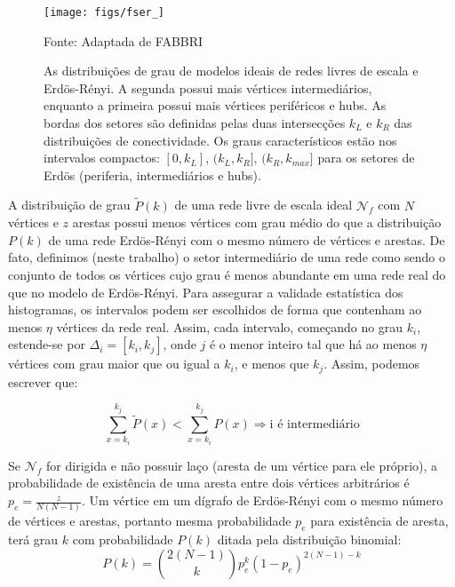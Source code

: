 \documentclass[a4paper,openright,12pt]{report} %
\newcommand{\source}[1]{\caption*{Fonte: {#1}} }
\begin{document}
\begin{figure}[!h]
    \centering
    \caption{ \footnotesize As distribuições de grau de modelos ideais de redes livres de escala e Erdös-Rényi.
        A segunda possui mais vértices intermediários, enquanto a primeira possui mais vértices
        periféricos e hubs. As bordas dos setores são definidas pelas duas intersecções $k_L$
        e $k_R$ das distribuições de conectividade.
        Os graus característicos estão nos intervalos compactos:
                $[0,k_L]$, $(k_L,k_R]$, $(k_R,k_{max}]$
    para os setores de Erdös (periferia, intermediários e hubs).}   
    \texttt{[image: figs/fser\_]}
        \source{Adaptada de FABBRI~\cite{timeS}}
        \label{fig:setores}
\end{figure}
\vspace{-.3cm}


A distribuição de grau
$\widetilde{P}(k)$
de uma rede livre de escala ideal
$\mathcal{N}_f$ com $N$ 
vértices e $z$ arestas possui menos
vértices com grau médio do que a distribuição $P(k)$
de uma rede Erdös-Rényi com o mesmo número de vértices e arestas.
De fato, definimos (neste trabalho) o setor intermediário de uma
rede como sendo o conjunto de todos os vértices cujo grau é
menos abundante em uma rede real do que no modelo de Erdös-Rényi.
Para assegurar a validade estatística dos histogramas, os intervalos podem
ser escolhidos de forma que contenham ao menos $\eta$ vértices da rede real.
Assim, cada intervalo, começando no grau $k_i$, estende-se por
$\Delta_i=[k_{i},k_{j}]$,
onde $j$ é o menor inteiro tal que há ao menos $\eta$ vértices com grau maior que ou igual a $k_i$,
e menos que $k_j$.
Assim, podemos escrever que:

\begin{equation}\label{criterio2}
    \sum_{x=k_i}^{k_j} \widetilde{P}(x) < \sum_{x=k_i}^{k_j} P(x) \Rightarrow \text{i é intermediário}
\end{equation}

Se $\mathcal{N}_f$ for dirigida e não possuir laço (aresta de um vértice para ele próprio),
a probabilidade
de existência de uma aresta entre dois vértices arbitrários é
$p_e=\frac{z}{N(N-1)}$.
Um vértice em um dígrafo de Erdös-Rényi com o mesmo número de vértices e arestas,
portanto mesma probabilidade
$p_e$
para existência de aresta, terá grau $k$ com probabilidade $P(k)$ ditada pela distribuição binomial:
\begin{equation}
    P(k)=\binom{2(N-1)}{k}p_e^k(1-p_e)^{2(N-1)-k}
\end{equation}
\end{document}
